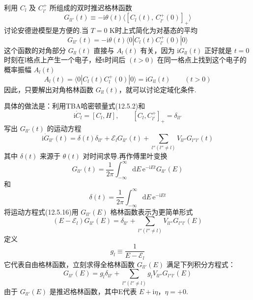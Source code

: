 利用 $C_{l}$ 及 $C_{l'}^{+}$ 所组成的双时推迟格林函数
\begin{equation}
  G_{ll'}\left(t\right)\equiv-\mathrm{i}\theta\left(t\right)
  \langle\left[C_{l}\left(t\right),\,C_{l'}^{+}\left(0\right)\right]_{+}\rangle
\end{equation}
讨论安德逊模型是方便的.当 $T=0$ K时上式简化为对基态的平均
\begin{equation}
  G_{ll'}\left(t\right)=-\mathrm{i}\theta\left(t\right)
  \langle0|C_{l}\left(t\right)C_{l'}^{+}\left(0\right)|0\rangle
\end{equation}
这个函数的对角部分 $G_{ll}\left(t\right)$ 直接与 $A_{l}\left(t\right)$ 有关，因为 $\mathrm{i}G_{ll}\left(t\right)$ 正好就是 $t=0$ 时刻在l格点上产生一个电子，经t时间后 $\left(t>0\right)$ 在同一格点上找到这个电子的概率振幅 $A_{l}\left(t\right)$
\begin{equation}
  A_{l}\left(t\right)=\langle0|C_{l}\left(t\right)C_{l}^{+}\left(0\right)|0\rangle
  =\mathrm{i}G_{ll}\left(t\right)\qquad\left(t>0\right)
\end{equation}
因此，只要解出对角格林函数 $G_{ll}\left(t\right)$，就可以讨论定域化条件.

具体的做法是：利用TBA哈密顿量式(12.5.2)和
\begin{equation}
  \mathrm{i}\dot{C}_{l}=\left[C_{l},H\right],\qquad
  \left[C_{l},C_{l'}^{+}\right]_{+}=\delta_{ll'}
\end{equation}
写出 $G_{ll'}\left(t\right)$ 的运动方程
\begin{equation}
  \mathrm{i}\dot{G}_{ll'}\left(t\right)=\delta\left(t\right)\delta_{ll'}
  +\mathscr{E}_{l}G_{ll'}\left(t\right)
  +\sum_{l''\left(l''\neq l\right)}V_{ll''}G_{l''l'}\left(t\right)
\end{equation}
其中 $\delta\left(t\right)$ 来源于 $\theta\left(t\right)$ 对时间求导.再作傅里叶变换
\begin{equation}
  G_{ll'}\left(t\right)=\frac{1}{2\pi}\int_{-\infty}^{\infty}
  \mathrm{d}E\,\mathrm{e}^{-\mathrm{i}Et}G_{ll'}\left(E\right)
\end{equation}
和
\begin{equation}
  \delta\left(t\right)=\frac{1}{2\pi}\int_{-\infty}^{\infty}\mathrm{d}E\,\mathrm{e}^{-\mathrm{i}Et}
\end{equation}
将运动方程式(12.5.16)用 $G_{ll'}\left(E\right)$ 格林函数表示为更简单形式
\begin{equation}
  \left(E-\mathscr{E}_{l}\right)G_{ll'}\left(E\right)=\delta_{ll'}
  +\sum_{l''\left(l''\neq l\right)}V_{ll''}G_{l''l'}\left(E\right)
\end{equation}
定义
\begin{equation}
  g_{l}\equiv\frac{1}{E-\mathscr{E}_{l}}
\end{equation}
它代表自由格林函数，立刻求得全格林函数 $G_{ll'}\left(E\right)$ 满足下列积分方程式：
\begin{equation}
  G_{ll'}\left(E\right)=g_{l}\delta_{ll'}
  +\sum_{l''\left(l''\neq l\right)}g_{l}V_{ll''}G_{l''l'}\left(E\right)
\end{equation}
由于 $G_{ll'}\left(E\right)$ 是推迟格林函数，其中E代表 $E+\mathrm{i}\eta$，$\eta=+0$.

